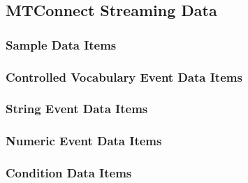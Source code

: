 \subsection{MTConnect Streaming Data}

\subsubsection{Sample Data Items}

\subsubsection{Controlled Vocabulary Event Data Items}

\subsubsection{String Event Data Items}

\subsubsection{Numeric Event Data Items}

\subsubsection{Condition Data Items}
